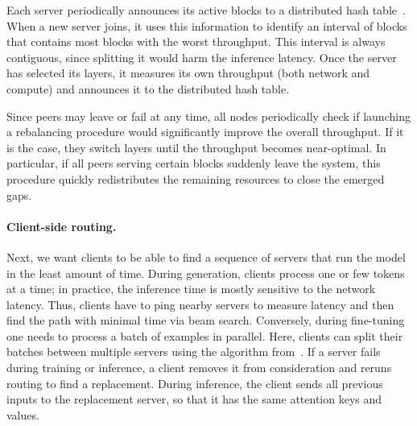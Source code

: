Each server periodically announces its active blocks to a distributed hash table~\citep{kademlia}. When a new server joins, it uses this information to identify an interval of blocks that contains most blocks with the worst throughput. This interval is always contiguous, since splitting it would harm the inference latency. Once the server has selected its layers, it measures its own throughput (both network and compute) and announces it to the distributed hash table. %

Since peers may leave or fail at any time, all nodes periodically check if launching a rebalancing procedure would significantly improve the overall throughput. If it is the case, they switch layers until the throughput becomes near-optimal. In particular, if all peers serving certain blocks suddenly leave the system, this procedure quickly redistributes the remaining resources to close the emerged gaps.



\paragraph{Client-side routing.} Next, we want clients to be able to find a sequence of servers that run the model in the least amount of time. During generation, clients process one or few tokens at a time; in practice, the inference time is mostly sensitive to the network latency. Thus, clients have to ping nearby servers to measure latency and then find the path with minimal time via beam search. Conversely, during fine-tuning one needs to process a batch of examples in parallel. %
Here, clients can split their batches between multiple servers using the algorithm from~\citet{ryabinin2021swarm}.
If a server fails during training or inference, a client removes it from consideration and reruns routing to find a replacement. During inference, the client sends all previous inputs to the replacement server, so that it has the same attention keys and values.


